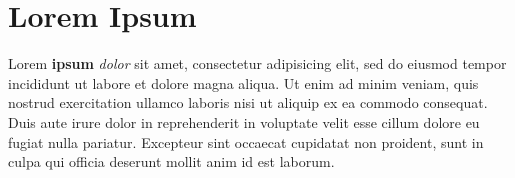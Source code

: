 \documentclass[12pt]{article}
\begin{document}
\section*{Lorem Ipsum}

Lorem \textbf{ipsum} \emph{dolor} sit amet, consectetur adipisicing elit, sed do eiusmod tempor incididunt ut labore et dolore magna aliqua. Ut enim ad minim veniam, quis nostrud exercitation ullamco laboris nisi ut aliquip ex ea commodo consequat. Duis aute irure dolor in reprehenderit in voluptate velit esse cillum dolore eu fugiat nulla pariatur. Excepteur sint occaecat cupidatat non proident, sunt in culpa qui officia deserunt mollit anim id est laborum.
\end{document}
